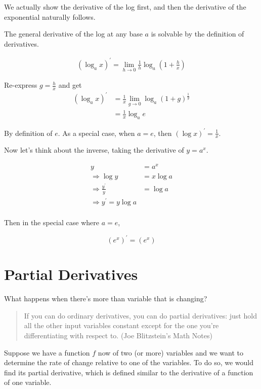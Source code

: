 \documentclass[
]{book}
\theoremstyle{definition}
\theoremstyle{definition}
\theoremstyle{definition}
\theoremstyle{remark}
\begin{document}
We actually show the derivative of the log first, and then the derivative of the exponential naturally follows.

The general derivative of the log at any base \(a\) is solvable by the definition of derivatives.

\begin{align*}
(\log_a x)^\prime = \lim\limits_{h\to 0} \frac{1}{h}\log_{a}\left(1 + \frac{h}{x}\right)
\end{align*}

Re-express \(g = \frac{h}{x}\) and get
\begin{align*}
(\log_a x)^\prime &= \frac{1}{x}\lim_{g\to 0}\log_{a} (1 + g)^{\frac{1}{g}}\\
&= \frac{1}{x}\log_a e
\end{align*}

By definition of \(e\). As a special case, when \(a = e\), then \((\log x)^\prime = \frac{1}{x}\).

Now let's think about the inverse, taking the derivative of \(y = a^x\).

\begin{align*}
y &= a^x \\
\Rightarrow \log y &= x \log a\\
\Rightarrow \frac{y^\prime}{y} &= \log a\\
\Rightarrow  y^\prime = y \log a\\
\end{align*}

Then in the special case where \(a = e\),

\[(e^x)^\prime = (e^x)\]

\hypertarget{partial-derivatives}{%
\section{Partial Derivatives}\label{partial-derivatives}}

What happens when there's more than variable that is changing?

\begin{quote}
If you can do ordinary derivatives, you can do partial derivatives: just hold all the other input variables constant except for the one you're differentiating with respect to. (Joe Blitzstein's Math Notes)
\end{quote}

Suppose we have a function \(f\) now of two (or more) variables and we want to determine the rate of change relative to one of the variables. To do so, we would find its partial derivative, which is defined similar to the derivative of a function of one variable.
\end{document}
